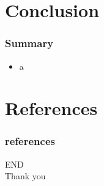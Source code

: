 \documentclass[aspectratio=1610]{beamer}
\begin{document}
\section{Conclusion}
\begin{frame}
\frametitle{Summary}
\begin{itemize}
  \item a
\end{itemize}
\end{frame}

\section{References}
\begin{frame}
	\frametitle{references}
	\printbibliography
\end{frame}
\begin{frame}
  \centering
  \Huge{END\\Thank you}
\end{frame}
\end{document}
